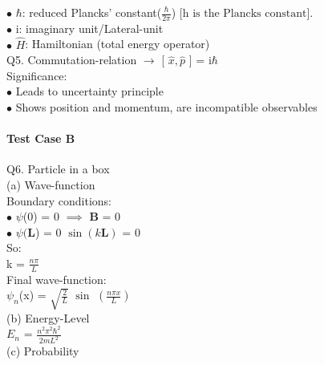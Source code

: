 \documentclass[a4paper, 10pt, onepage]{elegantbook}
\begin{document}
{$\bullet$ $\hbar$: reduced Plancks' constant($\frac{\hbar}{2 \pi}$) [$\text{h is the Plancks constant}$].  \\
  
$\bullet$ i: imaginary unit/Lateral-unit  \\
      
$\bullet$ $\hat {H}$: Hamiltonian (total energy operator)  \\

Q5. Commutation-relation $\longrightarrow$ [ $\hat {x}, \hat {p}$ ] = i$\hbar$ \\

Significance: \\ 

$\bullet$ Leads to uncertainty principle  \\

$\bullet$ Shows position and momentum, are incompatible observables \\
 
\paragraph{Test Case B}
\noindent

Q6. Particle in a box \\

(a) Wave-function  \\
 
Boundary conditions:  \\
  
$\bullet$ $\psi$(0) = 0 $\implies$ $\mathbf {B}$ = 0  \\

$\bullet$ $\psi ( \mathbf{L}$) = 0 $\sin ({k}{\mathbf L})$ = 0  \\
  
So:  \\

    k = $\frac{{n} \pi}{L}$  \\

Final wave-function: \\
 
$\psi_n$(x) = $\sqrt{\frac{2}{L}}$ $\sin$ $\left( \frac{{n} \pi {x}}{L} \right)$ \\
 
  
(b) Energy-Level \\

$E_n$ = $\frac{n^2 \pi^2 \hbar^2}{2{m}{L}^2}$ \\
 
(c) Probability \\
 
}
\end{document}

